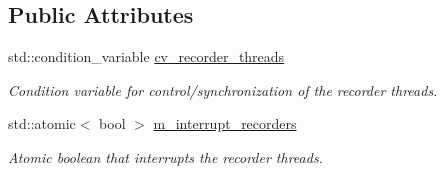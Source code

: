 \subsection*{Public Attributes}
\begin{DoxyCompactItemize}
\item 
\mbox{\label{classEventDetect_1_1InputEventRecorders_ac91f01b94760d0b711bd3159749bfb89}} 
std\+::condition\+\_\+variable \mbox{\hyperlink{classEventDetect_1_1InputEventRecorders_ac91f01b94760d0b711bd3159749bfb89}{cv\+\_\+recorder\+\_\+threads}}
\begin{DoxyCompactList}\small\item\em Condition variable for control/synchronization of the recorder threads. \end{DoxyCompactList}\item 
\mbox{\label{classEventDetect_1_1InputEventRecorders_ad6423bc9846cbd1bbfbda477d65ea76e}} 
std\+::atomic$<$ bool $>$ \mbox{\hyperlink{classEventDetect_1_1InputEventRecorders_ad6423bc9846cbd1bbfbda477d65ea76e}{m\+\_\+interrupt\+\_\+recorders}}
\begin{DoxyCompactList}\small\item\em Atomic boolean that interrupts the recorder threads. \end{DoxyCompactList}\end{DoxyCompactItemize}
